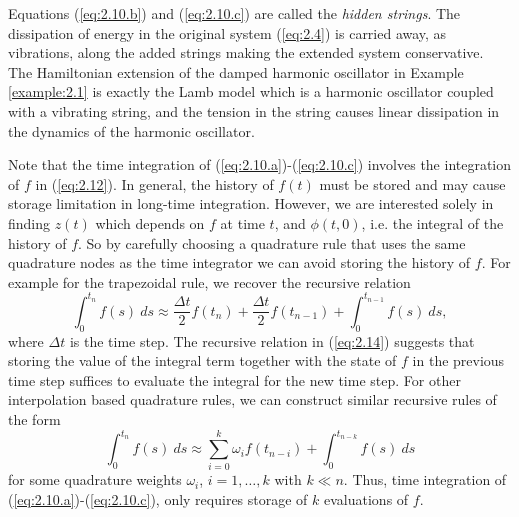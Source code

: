Equations (\ref{eq:2.10.b}) and (\ref{eq:2.10.c}) are called the \emph{hidden strings}. The dissipation of energy in the original system (\ref{eq:2.4}) is carried away, as vibrations, along the added strings making the extended system conservative. The Hamiltonian extension of the damped harmonic oscillator in Example \ref{example:2.1} is exactly the Lamb model \cite{lamb:1900} which is a harmonic oscillator coupled with a vibrating string, and the tension in the string causes linear dissipation in the dynamics of the harmonic oscillator.

Note that the time integration of (\ref{eq:2.10.a})-(\ref{eq:2.10.c}) involves the integration of $f$ in (\ref{eq:2.12}). In general, the history of $f(t)$ must be stored and may cause storage limitation in long-time integration. However, we are interested solely in finding $z(t)$ which depends on $f$ at time $t$, and $\phi(t,0)$, i.e. the integral of the history of $f$. So by carefully choosing a quadrature rule that uses the same quadrature nodes as the time integrator we can avoid storing the history of $f$. For example for the trapezoidal rule, we recover the recursive relation
\begin{equation} \label{eq:2.14}
	\int_{0}^{t_n} f(s) \ ds \approx \frac{\Delta t}{2} f(t_n) + \frac{\Delta t}{2} f(t_{n-1}) + \int_{0}^{t_{n-1}} f(s) \ ds,
\end{equation}
where $\Delta t$ is the time step. The recursive relation in (\ref{eq:2.14}) suggests that storing the value of the integral term together with the state of $f$ in the previous time step suffices to evaluate the integral for the new time step. For other interpolation based quadrature rules, we can construct similar recursive rules of the form
\begin{equation}
	\int_{0}^{t_n} f(s) \ ds \approx \sum_{i=0}^{k} \omega_i f(t_{n-i})  + \int_{0}^{t_{n-k}} f(s) \ ds
\end{equation}
for some quadrature weights $\omega_i$, $i=1,\dots,k$ with $k\ll n$. Thus, time integration of (\ref{eq:2.10.a})-(\ref{eq:2.10.c}), only requires storage of $k$ evaluations of $f$.
